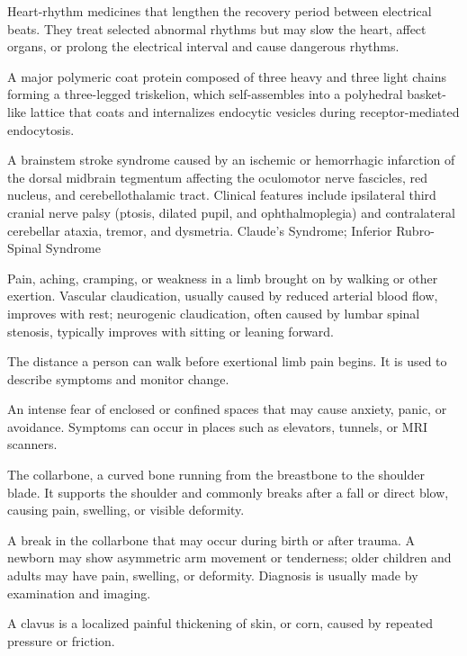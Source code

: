  Heart-rhythm medicines that lengthen the recovery period between electrical beats. They treat selected abnormal rhythms but may slow the heart, affect organs, or prolong the electrical interval and cause dangerous rhythms.

 A major polymeric coat protein composed of three heavy and three light chains forming a three-legged triskelion, which self-assembles into a polyhedral basket-like lattice that coats and internalizes endocytic vesicles during receptor-mediated endocytosis.

 A brainstem stroke syndrome caused by an ischemic or hemorrhagic infarction of the dorsal midbrain tegmentum affecting the oculomotor nerve fascicles, red nucleus, and cerebellothalamic tract. Clinical features include ipsilateral third cranial nerve palsy (ptosis, dilated pupil, and ophthalmoplegia) and contralateral cerebellar ataxia, tremor, and dysmetria.
\synonyms
Claude's Syndrome; Inferior Rubro-Spinal Syndrome

 Pain, aching, cramping, or weakness in a limb brought on by walking or other exertion. Vascular claudication, usually caused by reduced arterial blood flow, improves with rest; neurogenic claudication, often caused by lumbar spinal stenosis, typically improves with sitting or leaning forward.

 The distance a person can walk before exertional limb pain begins. It is used to describe symptoms and monitor change.

 An intense fear of enclosed or confined spaces that may cause anxiety, panic, or avoidance.
Symptoms can occur in places such as elevators, tunnels, or MRI scanners.

 The collarbone, a curved bone running from the breastbone to the shoulder blade. It supports the shoulder and commonly breaks after a fall or direct blow, causing pain, swelling, or visible deformity.

 A break in the collarbone that may occur during birth or after trauma. A newborn may show
asymmetric arm movement or tenderness; older children and adults may have pain, swelling, or deformity. Diagnosis is
usually made by examination and imaging.

 A clavus is a localized painful thickening of skin, or corn, caused by repeated pressure or friction.

